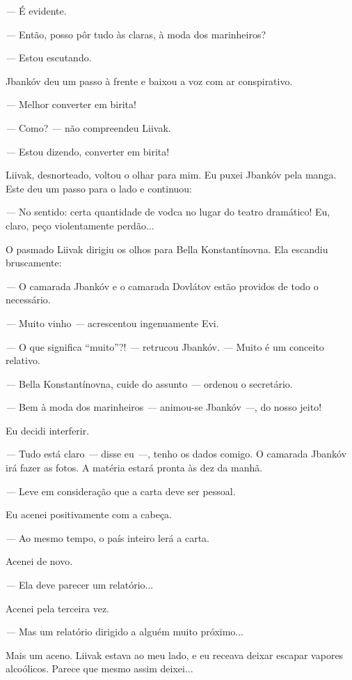 \emph{---} É evidente.

\emph{---} Então, posso pôr tudo às claras, à moda dos marinheiros?

\emph{---} Estou escutando.

Jbankóv deu um passo à frente e baixou a voz com ar conspirativo.

\emph{---} Melhor converter em birita!

\emph{---} Como? \emph{---} não compreendeu Liivak.

\emph{---} Estou dizendo, converter em birita!

Liivak, desnorteado, voltou o olhar para mim. Eu puxei Jbankóv pela
manga. Este deu um passo para o lado e continuou:

\emph{---} No sentido: certa quantidade de vodca no lugar do teatro
dramático! Eu, claro, peço violentamente perdão...

O pasmado Liivak dirigiu os olhos para Bella Konstantínovna. Ela
escandiu bruscamente:

\emph{---} O camarada Jbankóv e o camarada Dovlátov estão providos de
todo o necessário.

\emph{---} Muito vinho \emph{---} acrescentou ingenuamente Evi.

\emph{---} O que significa ``muito''?! \emph{---} retrucou Jbankóv.
\emph{---} Muito é um conceito relativo.

\emph{---} Bella Konstantínovna, cuide do assunto \emph{---} ordenou o
secretário.

\emph{---} Bem à moda dos marinheiros \emph{---} animou-se Jbankóv
\emph{---}, do nosso jeito!

Eu decidi interferir.

\emph{---} Tudo está claro \emph{---} disse eu \emph{---,} tenho os
dados comigo. O camarada Jbankóv irá fazer as fotos. A matéria estará
pronta às dez da manhã.

\emph{---} Leve em consideração que a carta deve ser pessoal.

Eu acenei positivamente com a cabeça.

\emph{---} Ao mesmo tempo, o país inteiro lerá a carta.

Acenei de novo.

\emph{---} Ela deve parecer um relatório...

Acenei pela terceira vez.

\emph{---} Mas um relatório dirigido a alguém muito próximo...

Mais um aceno. Liivak estava ao meu lado, e eu receava deixar escapar
vapores alcoólicos. Parece que mesmo assim deixei...

